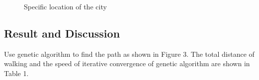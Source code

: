 \documentclass[12pt]{article}
\begin{document}
\begin{figure}[h]
    \centering
    \caption{Specific location of the city}
\end{figure}
\subsection{Result and Discussion}
Use genetic algorithm to find the path as shown in Figure 3.
The total distance of walking and the speed of iterative convergence of genetic algorithm are shown in Table 1.
\end{document}
